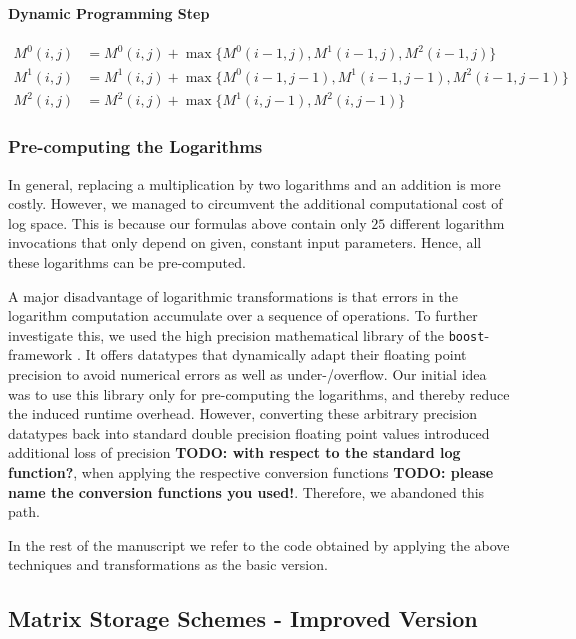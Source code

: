 \documentclass[runningheads,a4paper]{llncs}
\begin{document}
\paragraph{Dynamic Programming Step}
\begin{align*}
M^0(i,j) &= M^0(i,j) + \max\{M^0(i-1,j), M^1(i-1,j), M^2(i-1,j)\} \\
M^1(i,j) &= M^1(i,j) + \max\{M^0(i-1,j-1), M^1(i-1,j-1), M^2(i-1,j-1)\} \\
M^2(i,j) &= M^2(i,j) + \max\{M^1(i,j-1), M^2(i,j-1)\}
\end{align*}

\subsubsection{Pre-computing the Logarithms}
In general, replacing a multiplication by two logarithms and an addition is more costly. 
However, we managed to circumvent the additional computational cost of log space. 
This is because our formulas above contain only $25$ different logarithm invocations that only depend on given, constant input parameters.
Hence, all these logarithms can be pre-computed.

A major disadvantage of logarithmic transformations is that errors in the logarithm computation accumulate over a sequence of operations. 
To further investigate this, we used the high precision mathematical library of the \texttt{boost}-framework \cite{boost}. 
It offers datatypes that dynamically adapt their floating point precision to avoid numerical errors as well as under-/overflow. 
Our initial idea was to use this library only for pre-computing the logarithms, and thereby reduce the induced runtime overhead. 
However, converting these arbitrary precision datatypes back into standard double precision floating point values 
introduced additional loss of precision {\bf TODO: with respect to the standard log function?}, 
when applying the respective conversion functions {\bf TODO: please name the conversion functions you used!}.
Therefore, we abandoned this path.

In the rest of the manuscript we refer to the code obtained by applying the above techniques and transformations as the basic version.

\subsection{Matrix Storage Schemes - Improved Version}
\label{sec:caching}
\end{document}
